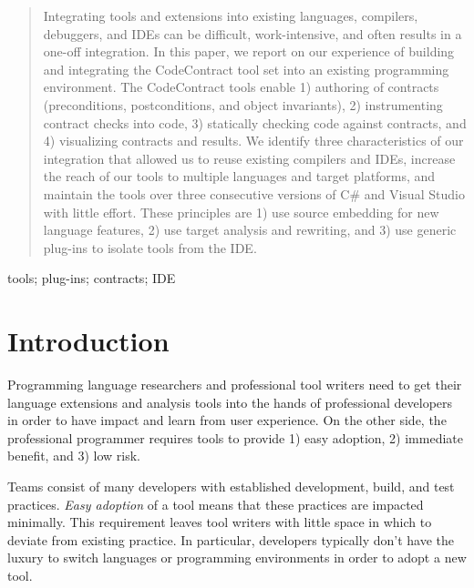 \documentclass[10pt, conference, compsocconf]{IEEEtran}
\begin{document}
\begin{abstract}
Integrating tools and extensions into existing languages, compilers,
debuggers, and IDEs can be difficult, work-intensive, and often
results in a one-off integration.  In this paper, we report on our
experience of building and integrating the CodeContract tool set into an
existing programming environment. The CodeContract tools enable 1)
authoring of contracts (preconditions, postconditions, and object
invariants), 2) instrumenting contract checks into code, 3) statically
checking code against contracts, and 4) visualizing contracts and
results. We identify three characteristics of our integration that
allowed us to reuse existing compilers and IDEs, increase the reach of our tools
to multiple languages and target platforms, and maintain the tools 
over three consecutive versions of C\# and Visual Studio with little effort.
These principles are 1) use source embedding for new language
features, 2) use target analysis and rewriting, and 3) use generic
plug-ins to isolate tools from the IDE.
\end{abstract}

\begin{IEEEkeywords}
tools; plug-ins; contracts; IDE
\end{IEEEkeywords}


%
\IEEEpeerreviewmaketitle



\section{Introduction}
\noindent
Programming language researchers and professional tool writers need to
get their language extensions and analysis tools into the hands of
professional developers in order to have impact and learn from user
experience. On the other side, the professional programmer requires
tools to provide 1) easy adoption, 2) immediate benefit, and 3) low
risk.

Teams consist of many developers with established development,
build, and test practices. \emph{Easy adoption} of a tool means that these
practices are impacted minimally. This requirement leaves tool writers with little
space in which to deviate from existing practice. 
In particular, developers typically don't have the luxury to switch
languages or programming environments in order to adopt a new
tool. 
\end{document}
